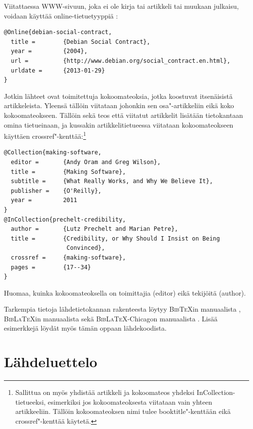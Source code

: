 \documentclass[utf8,bachelor]{gradu3}
\begin{document}
Viitattaessa WWW-sivuun, joka ei ole kirja tai artikkeli tai muukaan
julkaisu, voidaan käyttää
online-tietuetyyppiä \parencite[esim.][]{debian-social-contract}:

\begingroup\footnotesize
\begin{verbatim}
@Online{debian-social-contract,
  title =        {Debian Social Contract},
  year =         {2004},
  url =          {http://www.debian.org/social_contract.en.html},
  urldate =      {2013-01-29}
}
\end{verbatim}
\endgroup

Jotkin lähteet ovat toimitettuja kokoomateoksia, jotka koostuvat
itsenäisistä artikkeleista.  Yleensä tällöin viitataan johonkin sen
osa"-artikkeliin \parencite[esim.][]{prechelt-credibility} eikä koko
kokoomateokseen.  Tällöin sekä teos että viitatut artikkelit lisätään
tietokantaan omina tietueinaan, ja kussakin artikkelitietueessa
viitataan kokoomateokseen käyttäen
crossref"-kenttää:\footnote{Sallittua on myös yhdistää artikkeli ja
  kokoomateos yhdeksi InCollection-tietueeksi, esimerkiksi jos
  kokoomateoksesta viitataan vain yhteen artikkeeliin.  Tällöin
  kokoomateoksen nimi tulee booktitle"-kenttään eikä crossref"-kenttää
  käytetä.}

\begingroup\footnotesize
\begin{verbatim}
@Collection{making-software,
  editor =       {Andy Oram and Greg Wilson},
  title =        {Making Software},
  subtitle =     {What Really Works, and Why We Believe It},
  publisher =    {O'Reilly},
  year =         2011
}
@InCollection{prechelt-credibility,
  author =       {Lutz Prechelt and Marian Petre},
  title =        {Credibility, or Why Should I Insist on Being
                  Convinced},
  crossref =     {making-software},
  pages =        {17--34}
}
\end{verbatim}
\endgroup

Huomaa, kuinka kokoomateoksella on toimittajia (editor) eikä tekijöitä
(author).

Tarkempia tietoja lähdetietokannan rakenteesta löytyy
\textsc{Bib\TeX}in manuaalista \parencite{bibtexing},
\textsc{Bib\LaTeX}in manuaalista \parencite[luku~2]{biblatex-manual}
sekä \textsc{Bib\LaTeX}-Chicagon manuaalista
\parencite[luvut 5.1--5.2]{biblatex-chicago-manual}.  Lisää
esimerkkejä löydät myös tämän oppaan lähdekoodista.

\section{Lähdeluettelo}
\end{document}

